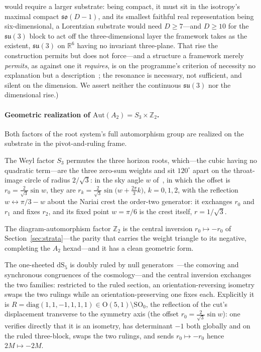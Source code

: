 \documentclass[11pt,a4paper]{article}
\theoremstyle{plain}
\theoremstyle{definition}
\theoremstyle{remark}
\newcommand{\dS}{\mathrm{dS}}
\begin{document}
would require a larger substrate: being compact, it must sit in the isotropy's maximal compact $\mathfrak{so}(D-1)$, and its smallest faithful real representation being six-dimensional, a Lorentzian substrate would need $D\ge7$---and $D\ge10$ for the $\mathfrak{su}(3)$ block to act off the three-dimensional layer the framework takes as the existent, $\mathfrak{su}(3)$ on $\mathbb{R}^6$ having no invariant three-plane. That rise the construction permits but does not force---and a structure a framework merely \emph{permits}, as against one it \emph{requires}, is on the programme's criterion of necessity no explanation but a description~\cite{JanzenShadowExistence}; the resonance is necessary, not sufficient, and silent on the dimension. We assert neither the continuous $\mathfrak{su}(3)$ nor the dimensional rise.)

\paragraph{Geometric realization of $\mathrm{Aut}(A_2)=S_3\times\mathbb{Z}_2$.}
Both factors of the root system's full automorphism group are realized on the substrate in the pivot-and-ruling frame. 

The Weyl factor $S_3$ permutes the three horizon roots, which---the cubic having no quadratic term---are the three zero-sum weights and sit $120^\circ$ apart on the throat-image circle of radius $2/\sqrt3$: in the sky angle $w$ of~\cite{JanzenSlicing}, in which the offset is $r_0=\tfrac{2}{\sqrt3}\sin w$, they are $r_k=\tfrac{2}{\sqrt3}\sin\!\bigl(w+\tfrac{2\pi}{3}k\bigr)$, $k=0,1,2$, with the reflection $w\leftrightarrow\pi/3-w$ about the Nariai crest the order-two generator: it exchanges $r_0$ and $r_1$ and fixes $r_2$, and its fixed point $w=\pi/6$ is the crest itself, $r=1/\sqrt3$. 

The diagram-automorphism factor $\mathbb{Z}_2$ is the central inversion $r_0\mapsto-r_0$ of Section~\ref{sec:strata}---the parity that carries the weight triangle to its negative, completing the $A_2$ hexad---and it has a clean geometric form. 

The one-sheeted $\dS_5$ is doubly ruled by null generators~\cite{JanzenOperator}---the comoving and synchronous congruences of the cosmology---and the central inversion exchanges the two families: restricted to the ruled section, an orientation-reversing isometry swaps the two rulings while an orientation-preserving one fixes each. Explicitly it is $R=\mathrm{diag}(1,1,-1,1,1,1)\in\mathrm{O}(5,1)\setminus\mathrm{SO}_0$, the reflection of the cut's displacement transverse to the symmetry axis (the offset $r_0=\tfrac{2}{\sqrt3}\sin w$): one verifies directly that it is an isometry, has determinant $-1$ both globally and on the ruled three-block, swaps the two rulings, and sends $r_0\mapsto-r_0$ hence $2M\mapsto-2M$. 
\end{document}
